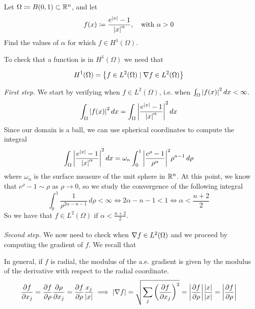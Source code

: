 \newpage
\begin{exercise}
    Let \(\Omega \coloneqq B(0, 1) \subset \mathbb{R}^n\), and let
    \[
        f(x) \coloneqq \frac{e^{\abs{x}}-1}{\abs{x}^\alpha}, \quad \text{with } \alpha > 0
    \]
    Find the values of \(\alpha\) for which \(f \in H^1(\Omega)\).
\end{exercise}
To check that a function is in \(H^1(\Omega)\) we need that
\begin{remark}
    \[
        H^1(\Omega) = \left\{ f \in L^2(\Omega) \mid \nabla f \in L^2(\Omega) \right\}
    \]
\end{remark}
\textit{First step.} We start by verifying when \(f \in L^2(\Omega)\), i.e. when \(\int_\Omega \abs{f(x)}^2 \, dx < \infty\).
\[
    \begin{split}
        \int_\Omega \abs{f(x)}^2 \, dx = \int_\Omega \abs{\frac{e^{\abs{x}}-1}{\abs{x}^\alpha}}^2 \, dx
    \end{split}
\]
Since our domain is a ball, we can use spherical coordinates to compute the
integral
\begin{align*}
    \int_\Omega \abs{\frac{e^{\abs{x}}-1}{\abs{x}^\alpha}}^2 \, dx = \omega_n \int_0^1 \abs{\frac{e^\rho-1}{\rho^\alpha}}^2 \rho^{n-1} \, d\rho
\end{align*}
where \(\omega_n\) is the surface measure of the unit sphere in \(\mathbb{R}^n\).
At this point, we know that $e^\rho - 1 \sim \rho$ as $\rho \to 0$, so we study the convergence of the following integral
\begin{equation*}
    \int_0^1 \frac{1}{\rho^{2\alpha - n - 1}} \, d\rho < \infty \iff 2 \alpha - n - 1 < 1 \iff \alpha < \frac{n+2}{2}
\end{equation*}
So we have that \(f \in L^2(\Omega)\) if \(\alpha < \frac{n+2}{2}\).\\
\vspace{0.1cm}\\
\textit{Second step.} We now need to check when \(\nabla f \in L^2(\Omega)\) and we proceed by computing the gradient of \(f\).
We recall that
\begin{remark}
    In general, if \(f\) is radial, the modulus of the a.e. gradient is given by the modulus of the derivative with respect to the radial coordinate.
    \begin{equation*}
        \frac{\partial f}{\partial x_j} = \frac{\partial f}{\partial \rho} \frac{\partial \rho}{\partial x_j} = \frac{\partial f}{\partial \rho} \frac{x_j}{\abs{x}}
        \implies \abs{\nabla f} = \sqrt{\sum_j \left(\frac{\partial f}{\partial x_j}\right)^2} = \abs{\frac{\partial f}{\partial \rho}} \frac{\abs{x}}{\abs{x}} = \abs{\frac{\partial f}{\partial \rho}}
    \end{equation*}
\end{remark}
